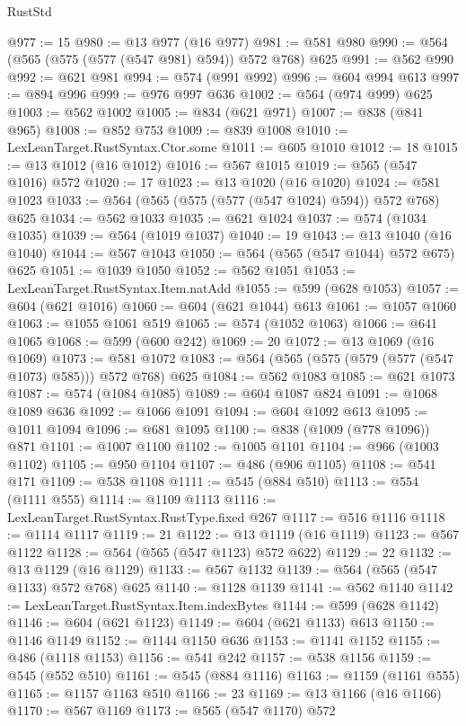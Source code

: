 \begin{lexlean}{RustStd}
\begin{coremodule}
@977 := 15
@980 := @13 @977 (@16 @977)
@981 := @581 @980
@990 := @564 (@565 (@575 (@577 (@547 @981) @594)) @572 @768) @625
@991 := @562 @990
@992 := @621 @981
@994 := @574 (@991 @992)
@996 := @604 @994 @613
@997 := @894 @996
@999 := @976 @997 @636
@1002 := @564 (@974 @999) @625
@1003 := @562 @1002
@1005 := @834 (@621 @971)
@1007 := @838 (@841 @965)
@1008 := @852 @753
@1009 := @839 @1008
@1010 := LexLeanTarget.RustSyntax.Ctor.some
@1011 := @605 @1010
@1012 := 18
@1015 := @13 @1012 (@16 @1012)
@1016 := @567 @1015
@1019 := @565 (@547 @1016) @572
@1020 := 17
@1023 := @13 @1020 (@16 @1020)
@1024 := @581 @1023
@1033 := @564 (@565 (@575 (@577 (@547 @1024) @594)) @572 @768) @625
@1034 := @562 @1033
@1035 := @621 @1024
@1037 := @574 (@1034 @1035)
@1039 := @564 (@1019 @1037)
@1040 := 19
@1043 := @13 @1040 (@16 @1040)
@1044 := @567 @1043
@1050 := @564 (@565 (@547 @1044) @572 @675) @625
@1051 := @1039 @1050
@1052 := @562 @1051
@1053 := LexLeanTarget.RustSyntax.Item.natAdd
@1055 := @599 (@628 @1053)
@1057 := @604 (@621 @1016)
@1060 := @604 (@621 @1044) @613
@1061 := @1057 @1060
@1063 := @1055 @1061 @519
@1065 := @574 (@1052 @1063)
@1066 := @641 @1065
@1068 := @599 (@600 @242)
@1069 := 20
@1072 := @13 @1069 (@16 @1069)
@1073 := @581 @1072
@1083 := @564 (@565 (@575 (@579 (@577 (@547 @1073) @585))) @572 @768) @625
@1084 := @562 @1083
@1085 := @621 @1073
@1087 := @574 (@1084 @1085)
@1089 := @604 @1087 @824
@1091 := @1068 @1089 @636
@1092 := @1066 @1091
@1094 := @604 @1092 @613
@1095 := @1011 @1094
@1096 := @681 @1095
@1100 := @838 (@1009 (@778 @1096)) @871
@1101 := @1007 @1100
@1102 := @1005 @1101
@1104 := @966 (@1003 @1102)
@1105 := @950 @1104
@1107 := @486 (@906 @1105)
@1108 := @541 @171
@1109 := @538 @1108
@1111 := @545 (@884 @510)
@1113 := @554 (@1111 @555)
@1114 := @1109 @1113
@1116 := LexLeanTarget.RustSyntax.RustType.fixed @267
@1117 := @516 @1116
@1118 := @1114 @1117
@1119 := 21
@1122 := @13 @1119 (@16 @1119)
@1123 := @567 @1122
@1128 := @564 (@565 (@547 @1123) @572 @622)
@1129 := 22
@1132 := @13 @1129 (@16 @1129)
@1133 := @567 @1132
@1139 := @564 (@565 (@547 @1133) @572 @768) @625
@1140 := @1128 @1139
@1141 := @562 @1140
@1142 := LexLeanTarget.RustSyntax.Item.indexBytes
@1144 := @599 (@628 @1142)
@1146 := @604 (@621 @1123)
@1149 := @604 (@621 @1133) @613
@1150 := @1146 @1149
@1152 := @1144 @1150 @636
@1153 := @1141 @1152
@1155 := @486 (@1118 @1153)
@1156 := @541 @242
@1157 := @538 @1156
@1159 := @545 (@552 @510)
@1161 := @545 (@884 @1116)
@1163 := @1159 (@1161 @555)
@1165 := @1157 @1163 @510
@1166 := 23
@1169 := @13 @1166 (@16 @1166)
@1170 := @567 @1169
@1173 := @565 (@547 @1170) @572

\end{coremodule}
\end{lexlean}
